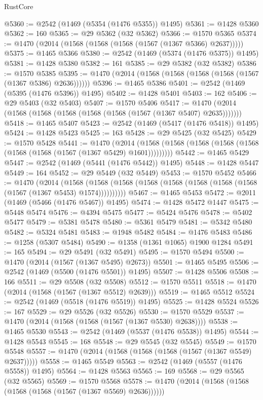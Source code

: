 \begin{lexlean}{RustCore}
\begin{coremodule}
@5360 := @2542 (@1469 (@5354 (@1476 @5355)) @1495)
@5361 := @1428 @5360
@5362 := 160
@5365 := @29 @5362 (@32 @5362)
@5366 := @1570 @5365
@5374 := @1470 (@2014 (@1568 (@1568 (@1568 (@1567 (@1367 @5366) @2637)))))
@5375 := @1465 @5366
@5380 := @2542 (@1469 (@5374 (@1476 @5375)) @1495)
@5381 := @1428 @5380
@5382 := 161
@5385 := @29 @5382 (@32 @5382)
@5386 := @1570 @5385
@5395 := @1470 (@2014 (@1568 (@1568 (@1568 (@1568 (@1567 (@1367 @5386) @2636))))))
@5396 := @1465 @5386
@5401 := @2542 (@1469 (@5395 (@1476 @5396)) @1495)
@5402 := @1428 @5401
@5403 := 162
@5406 := @29 @5403 (@32 @5403)
@5407 := @1570 @5406
@5417 := @1470 (@2014 (@1568 (@1568 (@1568 (@1568 (@1568 (@1567 (@1367 @5407) @2635)))))))
@5418 := @1465 @5407
@5423 := @2542 (@1469 (@5417 (@1476 @5418)) @1495)
@5424 := @1428 @5423
@5425 := 163
@5428 := @29 @5425 (@32 @5425)
@5429 := @1570 @5428
@5441 := @1470
    (@2014 (@1568 (@1568 (@1568 (@1568 (@1568 (@1568 (@1568 (@1567 (@1367 @5429) @1601)))))))))
@5442 := @1465 @5429
@5447 := @2542 (@1469 (@5441 (@1476 @5442)) @1495)
@5448 := @1428 @5447
@5449 := 164
@5452 := @29 @5449 (@32 @5449)
@5453 := @1570 @5452
@5466 := @1470
    (@2014
      (@1568 (@1568 (@1568 (@1568 (@1568 (@1568 (@1568 (@1568 (@1567 (@1367 @5453) @1574))))))))))
@5467 := @1465 @5453
@5472 := @2011 (@1469 (@5466 (@1476 @5467)) @1495)
@5474 := @1428 @5472 @1447
@5475 := @5448 @5474
@5476 := @4394 @5475
@5477 := @5424 @5476
@5478 := @5402 @5477
@5479 := @5381 @5478
@5480 := @5361 @5479
@5481 := @5342 @5480
@5482 := @5324 @5481
@5483 := @1948 @5482
@5484 := @1476 @5483
@5486 := @1258 (@5307 @5484)
@5490 := @1358 (@1361 @1065) @1900 @1284
@5491 := 165
@5494 := @29 @5491 (@32 @5491)
@5495 := @1570 @5494
@5500 := @1470 (@2014 (@1567 (@1367 @5495) @2673))
@5501 := @1465 @5495
@5506 := @2542 (@1469 (@5500 (@1476 @5501)) @1495)
@5507 := @1428 @5506
@5508 := 166
@5511 := @29 @5508 (@32 @5508)
@5512 := @1570 @5511
@5518 := @1470 (@2014 (@1568 (@1567 (@1367 @5512) @2639)))
@5519 := @1465 @5512
@5524 := @2542 (@1469 (@5518 (@1476 @5519)) @1495)
@5525 := @1428 @5524
@5526 := 167
@5529 := @29 @5526 (@32 @5526)
@5530 := @1570 @5529
@5537 := @1470 (@2014 (@1568 (@1568 (@1567 (@1367 @5530) @2638))))
@5538 := @1465 @5530
@5543 := @2542 (@1469 (@5537 (@1476 @5538)) @1495)
@5544 := @1428 @5543
@5545 := 168
@5548 := @29 @5545 (@32 @5545)
@5549 := @1570 @5548
@5557 := @1470 (@2014 (@1568 (@1568 (@1568 (@1567 (@1367 @5549) @2637)))))
@5558 := @1465 @5549
@5563 := @2542 (@1469 (@5557 (@1476 @5558)) @1495)
@5564 := @1428 @5563
@5565 := 169
@5568 := @29 @5565 (@32 @5565)
@5569 := @1570 @5568
@5578 := @1470 (@2014 (@1568 (@1568 (@1568 (@1568 (@1567 (@1367 @5569) @2636))))))

\end{coremodule}
\end{lexlean}
